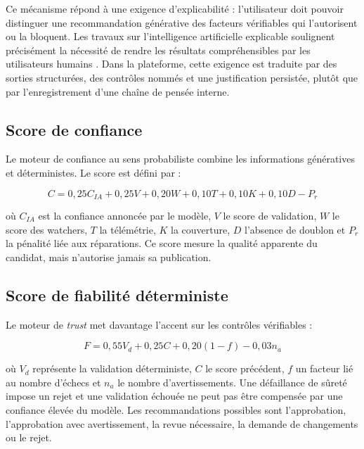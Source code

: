 Ce mécanisme répond à une exigence d'explicabilité : l'utilisateur doit pouvoir distinguer une recommandation générative des facteurs vérifiables qui l'autorisent ou la bloquent. Les travaux sur l'intelligence artificielle explicable soulignent précisément la nécessité de rendre les résultats compréhensibles par les utilisateurs humains \cite{arrieta2020xai}. Dans la plateforme, cette exigence est traduite par des sorties structurées, des contrôles nommés et une justification persistée, plutôt que par l'enregistrement d'une chaîne de pensée interne.

\subsection{Score de confiance}

Le moteur de confiance au sens probabiliste combine les informations génératives et déterministes. Le score est défini par :

\begin{equation}
C = 0{,}25C_{IA} + 0{,}25V + 0{,}20W + 0{,}10T + 0{,}10K + 0{,}10D - P_r
\end{equation}

où $C_{IA}$ est la confiance annoncée par le modèle, $V$ le score de validation, $W$ le score des watchers, $T$ la télémétrie, $K$ la couverture, $D$ l'absence de doublon et $P_r$ la pénalité liée aux réparations. Ce score mesure la qualité apparente du candidat, mais n'autorise jamais sa publication.

\subsection{Score de fiabilité déterministe}

Le moteur de \textit{trust} met davantage l'accent sur les contrôles vérifiables :

\begin{equation}
F = 0{,}55V_d + 0{,}25C + 0{,}20(1-f) - 0{,}03n_a
\end{equation}

où $V_d$ représente la validation déterministe, $C$ le score précédent, $f$ un facteur lié au nombre d'échecs et $n_a$ le nombre d'avertissements. Une défaillance de sûreté impose un rejet et une validation échouée ne peut pas être compensée par une confiance élevée du modèle. Les recommandations possibles sont l'approbation, l'approbation avec avertissement, la revue nécessaire, la demande de changements ou le rejet.

